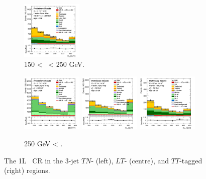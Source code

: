 \begin{figure}[h!]
\begin{subfigure}[b]{\textwidth}
        \includegraphics[width=0.32\textwidth]{Images/VH/Own_fit/postfit_VHcc/Region_distmBB_BMax250_BMin150_DCRHigh_J3_TTypett_T2_L1_Y6051_GlobalFit_conditionnal_mu1.png}
        \caption{150 < \ptv\ < 250 GeV.}
        \label{fig:plots_VHcc_1L_150_CRH_3J}
    \end{subfigure}
    \begin{subfigure}[b]{\textwidth}
        \centering
        \includegraphics[width=0.32\textwidth]{Images/VH/Own_fit/postfit_VHcc/Region_distpTV_BMin250_DCRHigh_J3_TTypent_T1_L1_Y6051_GlobalFit_conditionnal_mu1.png}
        \includegraphics[width=0.32\textwidth]{Images/VH/Own_fit/postfit_VHcc/Region_distmBB_BMin250_DCRHigh_J3_TTypelt_T2_L1_Y6051_GlobalFit_conditionnal_mu1.png}
        \includegraphics[width=0.32\textwidth]{Images/VH/Own_fit/postfit_VHcc/Region_distmBB_BMin250_DCRHigh_J3_TTypett_T2_L1_Y6051_GlobalFit_conditionnal_mu1.png}
        \caption{250 GeV < \ptv.}
        \label{fig:plots_VHcc_1L_250_CRH_3J}
    \end{subfigure}
    \caption{The 1L \highdr\ CR in the 3-jet $TN$- (left), $LT$- (centre), and $TT$-tagged (right) regions.}
    \label{fig:plots_VHcc_1L_CRH_3J}
\end{figure}

